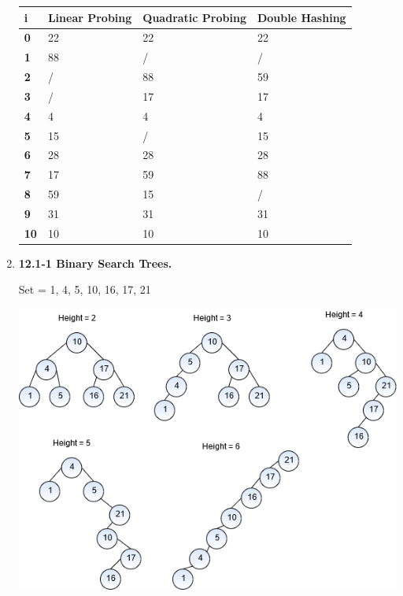 \documentclass{article}
\begin{document}
\begin{enumerate}
    \begin{table}[H]
      \begin{tabular}{|l|l|l|l|}
      \hline
      \textbf{i}  & \textbf{Linear Probing} & \textbf{Quadratic Probing} & \textbf{Double Hashing} \\ \hline
      \textbf{0}  & 22                      & 22                         & 22                      \\ \hline
      \textbf{1}  & 88                      & /                          & /                       \\ \hline
      \textbf{2}  & /                       & 88                         & 59                      \\ \hline
      \textbf{3}  & /                       & 17                         & 17                      \\ \hline
      \textbf{4}  & 4                       & 4                          & 4                       \\ \hline
      \textbf{5}  & 15                      & /                          & 15                      \\ \hline
      \textbf{6}  & 28                      & 28                         & 28                      \\ \hline
      \textbf{7}  & 17                      & 59                         & 88                      \\ \hline
      \textbf{8}  & 59                      & 15                         & /                       \\ \hline
      \textbf{9}  & 31                      & 31                         & 31                      \\ \hline
      \textbf{10} & 10                      & 10                         & 10                      \\ \hline
      \end{tabular}
    \end{table}

    \item \textbf{12.1-1 Binary Search Trees.}
    
    Set = {1, 4, 5, 10, 16, 17, 21}

    \includegraphics[width=\linewidth]{BTree.png}


\end{enumerate}
\end{document}
